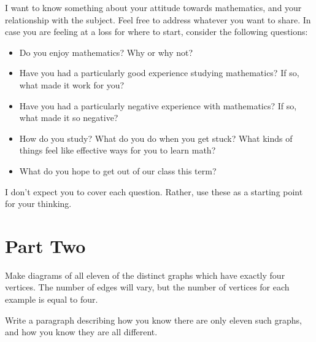 \documentclass[12pt,letterpaper]{article}
\begin{document}
I want to know something about your attitude towards mathematics, and your relationship with the subject.
Feel free to address whatever you want to share.
In case you are feeling at a loss for where to start, consider the following questions:
\begin{itemize}
\item Do you enjoy mathematics? Why or why not?
\item Have you had a particularly good experience studying mathematics?
If so, what made it work for you?
\item Have you had a particularly negative experience with mathematics?
If so, what made it so negative?
\item How do you study? What do you do when you get stuck? What kinds of things feel like effective ways for you to
learn math?
\item What do you hope to get out of our class this term?
\end{itemize}
I don't expect you to cover each question. Rather, use these as a starting point for your thinking.\\[.25in]



\section*{Part Two}

Make diagrams of all eleven of the distinct graphs which have exactly four vertices. The number of edges will vary, but the number of vertices for each example is equal to four. 

Write a paragraph describing how you know there are only eleven such graphs, and how you know they are all different.
\end{document}
